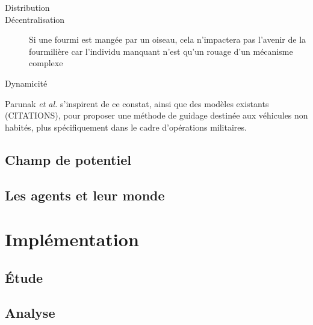 \documentclass[12pt]{article}
\begin{document}
\begin{description}
  \item[Distribution]{}
  \item[Décentralisation]{Si une fourmi est mangée par un oiseau, cela
  n'impactera pas l'avenir de la fourmilière car l'individu manquant
  n'est qu'un rouage d'un mécanisme complexe}
  \item[Dynamicité]{}
\end{description}

Parunak \textit{et al.} s'inspirent de ce constat, ainsi que des
modèles existants (CITATIONS), pour proposer une méthode de guidage
destinée aux véhicules non habités, plus spécifiquement dans le cadre
d'opérations militaires.



\subsection{Champ de potentiel}

\subsection{Les agents et leur monde}

\section{Implémentation}

\subsection{\'Etude}

\subsection{Analyse}



\end{document}
